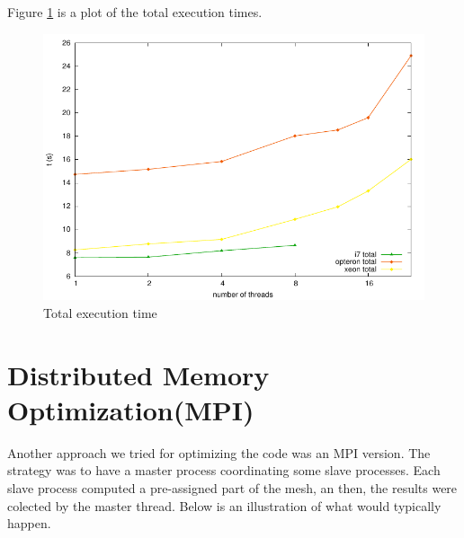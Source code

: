 \documentclass[a4paper,10pt,openright,openbib,twocolumn]{article}
\begin{document}
Figure \ref{fig:total} is a plot of the total execution times.

\begin{figure}[!htb]
    \centering
    \begin{minipage}[t]{\columnwidth}
        \includegraphics[width=\textwidth]{../../../openmp/results/total.pdf}
        \caption{Total execution time \label{fig:total}}
    \end{minipage}
\end{figure}

\section{Distributed Memory Optimization(MPI)}
\label{mpi}

Another approach we tried for optimizing the code was an MPI version. The strategy was to have a master process coordinating some slave processes. Each slave process computed a pre-assigned part of the mesh, an then, the results were colected by the master thread. Below is an illustration of what would typically happen.
\end{document}
